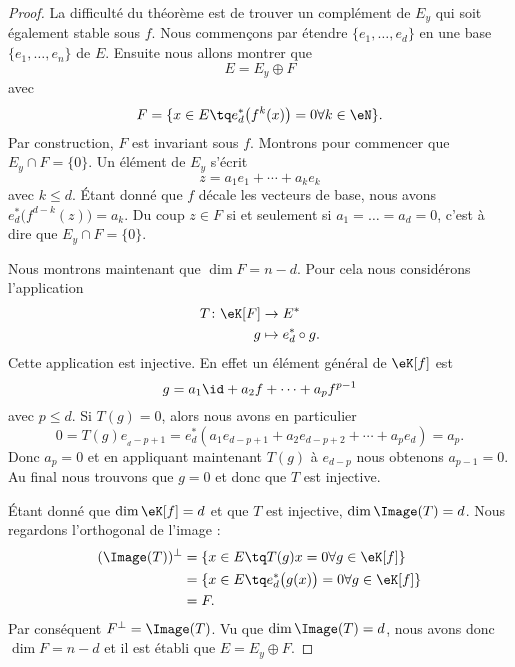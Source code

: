 \begin{proof}
    La difficulté du théorème est de trouver un complément de \( E_y\) qui soit également stable sous \( f\). Nous commençons par étendre \( \{ e_1,\ldots, e_d \}\) en une base \( \{ e_1,\ldots, e_n \}\) de \( E\). Ensuite nous allons montrer que
    \begin{equation}
        E=E_y\oplus F
    \end{equation}
    avec
    \begin{equation}
        F=\{ x\in E\tq  e^*_d\big( f^k(x) \big)=0\forall k\in \eN \}.
    \end{equation}
    Par construction, \( F\) est invariant sous \( f\). Montrons pour commencer que \( E_y\cap F=\{ 0 \}\). Un élément de \( E_y\) s'écrit
    \begin{equation}
        z=a_1e_1+\cdots +a_ke_k
    \end{equation}
    avec \( k\leq d\). Étant donné que \( f\) décale les vecteurs de base, nous avons \( e^*_d\big( f^{d-k}(z) \big)=a_k\). Du coup \( z\in F\) si et seulement si \( a_1=\ldots=a_d=0\), c'est à dire que \( E_y\cap F=\{ 0 \}\).

    Nous montrons maintenant que \( \dim F=n-d\). Pour cela nous considérons l'application
    \begin{equation}
        \begin{aligned}
            T\colon \eK[F]&\to E^* \\
            g&\mapsto e^*_d\circ g. 
        \end{aligned}
    \end{equation}
    Cette application est injective. En effet un élément général de \( \eK[f]\) est
    \begin{equation}
        g=a_1\id+a_2f+\cdots +a_pf^{p-1}
    \end{equation}
    avec \( p\leq d\). Si \( T(g)=0\), alors nous avons en particulier
    \begin{equation}
        0=T(g)e_{_d-p+1}=e^*_d(a_1e_{d-p+1}+a_2e_{d-p+2}+\cdots +a_pe_d)=a_p.
    \end{equation}
    Donc \( a_p=0\) et en appliquant maintenant \( T(g)\) à \( e_{d-p}\) nous obtenons \( a_{p-1}=0\). Au final nous trouvons que \( g=0\) et donc que \( T\) est injective.

    Étant donné que \( \dim\eK[f]=d\) et que \( T\) est injective, \( \dim\Image(T)=d\). Nous regardons l'orthogonal de l'image :
    \begin{subequations}
        \begin{align}
            (\Image(T))^{\perp}&=\{ x\in E\tq T(g)x=0\forall g\in\eK[f] \}\\
            &=\{ x\in E\tq e^*_d\big( g(x) \big)=0\forall g\in \eK[f] \}\\
            &=F.
        \end{align}
    \end{subequations}
    Par conséquent \( F^{\perp}=\Image(T)\). Vu que \( \dim\Image(T)=d\), nous avons donc \( \dim F=n-d\) et il est établi que \( E=E_y\oplus F\). 


\end{proof}
